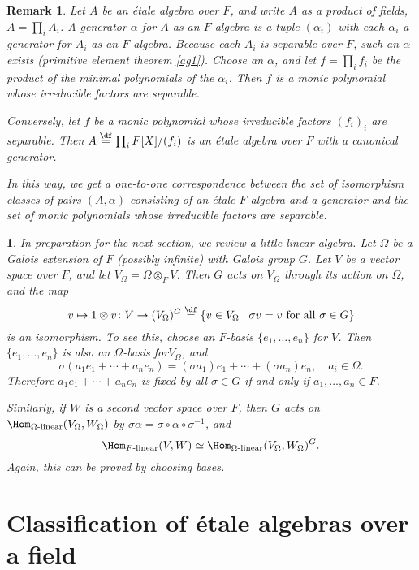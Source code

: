 \documentclass[a4paper,11pt,final,openany]{memoir}
\newtheorem{remark}[X]{Remark}
\newtheorem{plain}[X]{}
\theoremstyle{nonumberplain}
\begin{document}
\begin{remark}
\label{b70}Let $A$ be an \'{e}tale algebra over $F$, and write $A$ as a
product of fields, $A=\prod\nolimits_{i}A_{i}$. A generator $\alpha$ for $A$
as an $F$-algebra is a tuple $(\alpha_{i})$ with each $\alpha_{i}$ a generator
for $A_{i}$ as an $F$-algebra. Because each $A_{i}$ is separable over $F$,
such an $\alpha$ exists (primitive element theorem \ref{ag1}). Choose an
$\alpha$, and let $f=\prod\nolimits_{i}f_{i}$ be the product of the minimal
polynomials of the $\alpha_{i}$. Then $f$ is a monic polynomial whose
irreducible factors are separable.

Conversely, let $f$ be a monic polynomial whose irreducible factors
$(f_{i})_{i}$ are separable. Then $A\overset{\df}{=}%
\prod\nolimits_{i}F[X]/(f_{i})$ is an \'{e}tale algebra over $F$ with a
canonical generator.

In this way, we get a one-to-one correspondence between the set of isomorphism
classes of pairs $(A,\alpha)$ consisting of an \'{e}tale $F$-algebra and a
generator and the set of monic polynomials whose irreducible factors are separable.
\end{remark}

\begin{plain}
\label{b71}In preparation for the next section, we review a little linear
algebra. Let $\Omega$ be a Galois extension of $F$ (possibly infinite) with
Galois group $G$. Let $V$ be a vector space over $F$, and let $V_{\Omega
}=\Omega\otimes_{F}V$. Then $G$ acts on $V_{\Omega}$ through its action on
$\Omega$, and the map
\[
v\mapsto1\otimes v\colon V\rightarrow(V_{\Omega})^{G}%
\overset{\df}{=}\{v\in V_{\Omega}\mid\sigma v=v\text{ for all
}\sigma\in G\}
\]
is an isomorphism. To see this, choose an $F$-basis $\{e_{1},\ldots,e_{n}\}$
for $V$. Then $\{e_{1},\ldots,e_{n}\}$ is also an $\Omega$-basis
for$V_{\Omega}$, and%
\[
\sigma(a_{1}e_{1}+\cdots+a_{n}e_{n})=(\sigma a_{1})e_{1}+\cdots+(\sigma
a_{n})e_{n},\quad a_{i}\in\Omega.
\]
Therefore $a_{1}e_{1}+\cdots+a_{n}e_{n}$ is fixed by all $\sigma\in G$ if and
only if $a_{1},\ldots,a_{n}\in F$.

Similarly, if $W$ is a second vector space over $F$, then $G$ acts on
$\Hom_{\Omega\text{-linear}}(V_{\Omega},W_{\Omega})$ by $\sigma\alpha
=\sigma\circ\alpha\circ\sigma^{-1}$, and
\[
\Hom_{F\text{-linear}}(V,W)\simeq\Hom_{\Omega\text{-linear}}(V_{\Omega
},W_{\Omega})^{G}.
\]
Again, this can be proved by choosing bases.
\end{plain}

\section{Classification of \'{e}tale algebras over a field}
\end{document}

